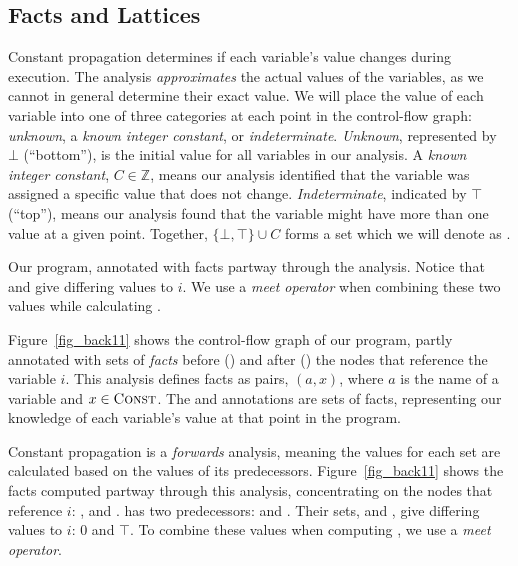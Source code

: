 \documentclass[12pt]{report}
\begin{document}
\subsection{Facts and Lattices} 
\label{back_subsec_facts}

Constant propagation determines if each variable's value changes
during execution. The analysis \emph{approximates} the actual values
of the variables, as we cannot in general determine their exact
value. We will place the value of each variable into one of three
categories at each point in the control-flow graph: \emph{unknown}, a
\emph{known integer constant}, or
\emph{indeterminate}. \emph{Unknown}, represented by $\bot$
(``bottom''), is the initial value for all variables in our
analysis. A \emph{known integer constant}, $C \in \mathbb{Z}$, means our analysis identified
that the variable was assigned a specific value that does not
change. \emph{Indeterminate}, indicated by $\top$ (``top''), means our
analysis found that the variable might have more than one value at a
given point. Together, $\{\bot, \top\} \cup C$ forms a set which we
will denote as \setLC.

\begin{myfig}
  
  \caption{Our program, annotated with facts partway through the
    analysis. Notice that  and
     give differing values to $i$. We use a \emph{meet
      operator} when combining these two values while calculating
    .}
  \label{fig_back11}
\end{myfig}

Figure~\ref{fig_back11} shows the control-flow graph of our program,
partly annotated with sets of \emph{facts} before (\inE) and after
(\out) the nodes that reference the variable $i$. This analysis
defines facts as pairs, $(a,x)$, where $a$ is the name of a variable
and $x \in \textsc{Const}$. The \inE and \out annotations are sets of
facts, representing our knowledge of each variable's value at that
point in the program.

Constant propagation is a \emph{forwards} analysis, meaning the values
for each \inE set are calculated based on the \out values of its
predecessors. Figure~\ref{fig_back11} shows the facts computed partway
through this analysis, concentrating on the nodes that reference $i$:
,  and
.  has two
predecessors:  and
. Their \out sets,
 and , give differing
values to $i$: 0 and $\top$. To combine these values when computing
, we use a \emph{meet operator}.
\end{document}
